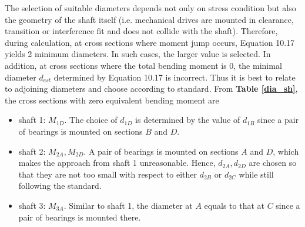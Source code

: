The selection of suitable diameters depends not only on stress condition but also the geometry of the shaft itself (i.e. mechanical drives are mounted in clearance, transition or interference fit and does not collide with the shaft). Therefore, during calculation, at cross sections where moment jump occurs, Equation 10.17 \cite{tk1} yields 2 minimum diameters. In such cases, the larger value is selected. In addition, at cross sections where the total bending moment is 0, the minimal diameter $ d_{est} $ determined by Equation 10.17 \cite{tk1} is incorrect. Thus it is best to relate to adjoining diameters and choose according to standard. From \textbf{Table \ref{dia_sh}}, the cross sections with zero equivalent bending moment are
\begin{itemize}
	\item shaft 1: $ M_{1D} $. The choice of $ d_{1D} $ is determined by the value of $ d_{1B} $ since a pair of bearings is mounted on sections $ B $ and $ D $.
	\item shaft 2: $ M_{2A}, M_{2D} $. A pair of bearings is mounted on sections $ A $ and $ D $, which makes the approach from shaft 1 unreasonable. Hence, $ d_{2A}, d_{2D} $ are chosen so that they are not too small with respect to either $ d_{2B} $ or $ d_{2C} $ while still following the standard.
	\item shaft 3: $ M_{3A} $. Similar to shaft 1, the diameter at $ A $ equals to that at $ C $ since a pair of bearings is mounted there.
\end{itemize}

